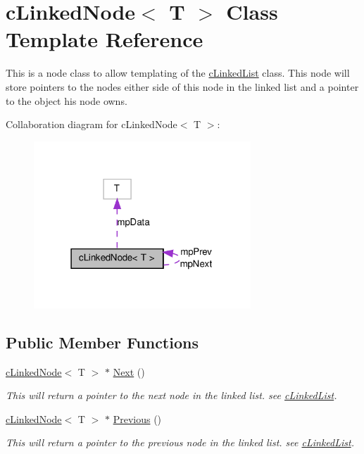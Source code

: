 \hypertarget{classc_linked_node}{
\section{cLinkedNode$<$ T $>$ Class Template Reference}
\label{classc_linked_node}
}


This is a node class to allow templating of the \hyperlink{classc_linked_list}{cLinkedList} class. This node will store pointers to the nodes either side of this node in the linked list and a pointer to the object his node owns.  




Collaboration diagram for cLinkedNode$<$ T $>$:
\nopagebreak
\begin{figure}[H]
\begin{center}
\leavevmode
\includegraphics[width=231pt]{classc_linked_node__coll__graph}
\end{center}
\end{figure}
\subsection*{Public Member Functions}
\begin{DoxyCompactItemize}
\item 
\hyperlink{classc_linked_node}{cLinkedNode}$<$ T $>$ $\ast$ \hyperlink{classc_linked_node_ac375aeade4f13f07a601732e80b49e8b}{Next} ()
\begin{DoxyCompactList}\small\item\em This will return a pointer to the next node in the linked list. see \hyperlink{classc_linked_list}{cLinkedList}. \item\end{DoxyCompactList}\item 
\hyperlink{classc_linked_node}{cLinkedNode}$<$ T $>$ $\ast$ \hyperlink{classc_linked_node_a6481dec71a6adffa72fd9621f366253a}{Previous} ()
\begin{DoxyCompactList}\small\item\em This will return a pointer to the previous node in the linked list. see \hyperlink{classc_linked_list}{cLinkedList}. \item\end{DoxyCompactList}\end{DoxyCompactItemize}
